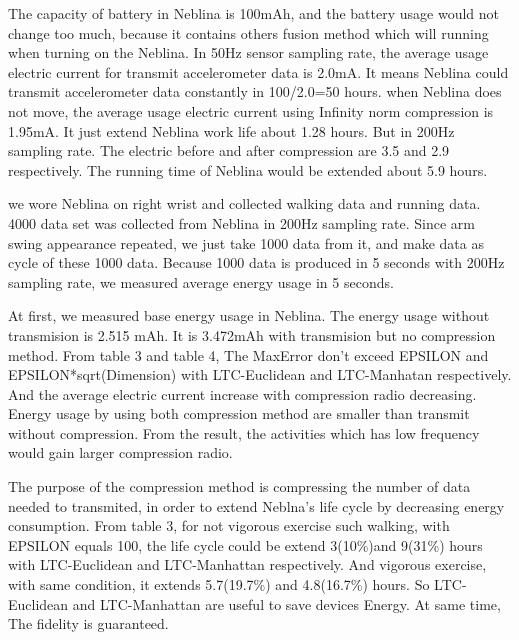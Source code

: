 \documentclass[10pt, conference, compsocconf]{IEEEtran}
\newcommand{\todo}[1]{\marginpar{\parbox{18mm}{\flushleft\tiny\color{red}\textbf{TODO}:
      #1}}}
\begin{document}
The capacity of battery in Neblina is 100mAh, and the battery usage 
would not change too much, because it contains others fusion method 
which will running when turning on the Neblina. In 50Hz sensor sampling 
rate, the average usage electric current for transmit accelerometer 
data is 2.0mA. It means Neblina could transmit accelerometer data 
constantly in 100/2.0=50 hours. when Neblina does not move, the average 
usage electric current using Infinity norm compression is 1.95mA. It 
just extend Neblina work life about 1.28 hours. But in 200Hz sampling 
rate. The electric before and after compression are 3.5 and 2.9 
respectively. The running time of Neblina would be extended about 5.9 
hours.

we wore Neblina on right wrist and
collected walking data and running data. 4000 data set was collected
from Neblina in 200Hz sampling rate. Since arm swing appearance
repeated, we just take 1000 data from it, and make data as cycle of
these 1000 data. Because 1000 data is produced in 5 seconds with 200Hz
sampling rate, we measured average energy usage in 5 seconds.


At first, we measured base energy usage in Neblina. The energy usage
without transmision is 2.515 mAh. It is 3.472mAh with transmision but
no compression method. From table 3 and table 4, The MaxError don't exceed EPSILON
and EPSILON*sqrt(Dimension) with LTC-Euclidean and LTC-Manhatan respectively.
And the average electric current increase with compression radio decreasing.
Energy usage by using both compression method are smaller than transmit
without compression. From the result, the activities which has low frequency
would gain larger compression radio.

The purpose of the compression method is compressing the number of
data needed to transmited, in order to extend Neblna's life cycle
by decreasing energy consumption. From table 3, for not vigorous exercise
such walking, with EPSILON equals 100, the life cycle could be extend
3(10\%)and 9(31\%) hours with LTC-Euclidean and LTC-Manhattan respectively.
And vigorous exercise, with same condition, it extends 5.7(19.7\%)
and 4.8(16.7\%) hours. So LTC-Euclidean and LTC-Manhattan are useful
to save devices Energy. At same time, The fidelity is guaranteed.

\end{document}
